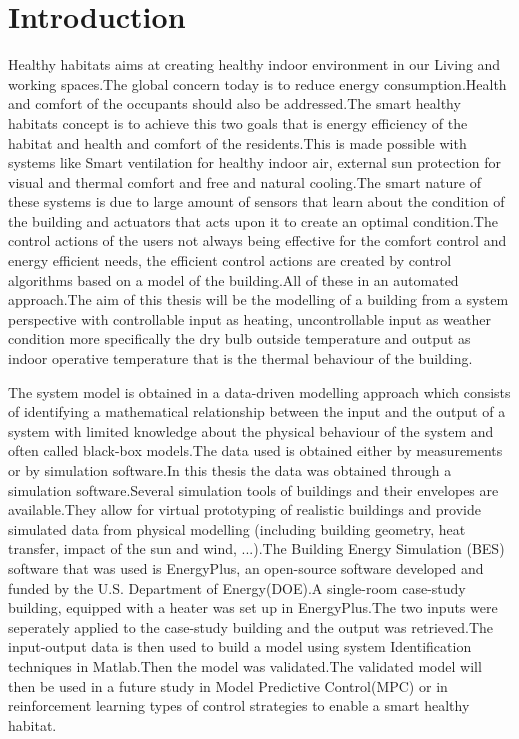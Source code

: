 \documentclass[a4paper,12pt]{article}
\numberwithin{equation}{section}
\begin{document}
\section{Introduction}
Healthy habitats aims at creating healthy indoor environment in our Living and working spaces.The global concern today is to reduce energy consumption.Health and comfort of the occupants should also be addressed.The smart healthy habitats concept is to achieve this two goals that is energy efficiency of the habitat and health and comfort of the residents.This is made possible with systems like Smart ventilation for healthy indoor air, external sun protection for visual and thermal comfort and free and natural cooling.The smart nature of these systems is due to large amount of sensors that learn about the condition of the building and actuators that acts upon it to create an optimal condition.The control actions of the users  not always being effective for the comfort control and energy efficient needs, the efficient control actions are created by control algorithms based on a model of the building.All of these in an automated approach.The aim of this thesis will be the modelling of a building from a system perspective with controllable input as heating, uncontrollable input as weather condition more specifically the dry bulb outside temperature and output as indoor operative temperature that is the thermal behaviour of the building.  

The system model is obtained in a data-driven modelling approach which consists of identifying a mathematical relationship between the input and the output of a system with limited knowledge about the physical behaviour of the system and often called black-box models.The data used is obtained either by measurements or by simulation software.In this thesis the data was obtained through a simulation software.Several simulation tools of buildings and their envelopes are available.They allow for virtual prototyping of realistic buildings and provide simulated data from physical modelling (including building geometry, heat transfer, impact of the sun and wind, ...).The Building Energy Simulation (BES) software that was used is EnergyPlus, an open-source software developed and funded by the U.S. Department of Energy(DOE).A  single-room case-study building, equipped with a heater was set up in EnergyPlus.The two inputs were seperately applied to the case-study building and the output was retrieved.The input-output data is then used to build a model using system Identification techniques in Matlab.Then the model was validated.The validated model will then be used in a future study in Model Predictive Control(MPC) or in reinforcement learning types of control strategies to enable a smart healthy habitat.
\end{document}
